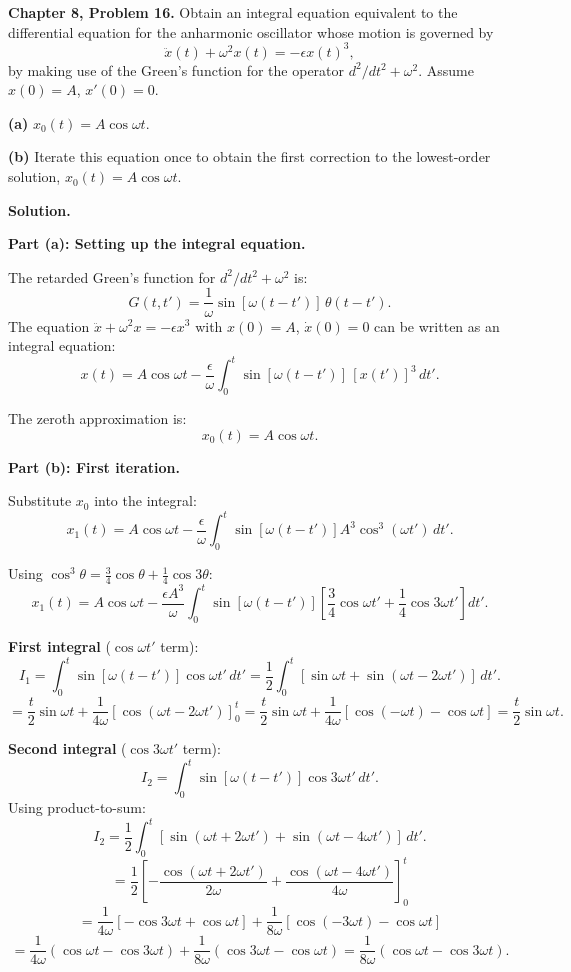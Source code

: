 \documentclass[12pt]{article}
\begin{document}
\textbf{Chapter 8, Problem 16.} Obtain an integral equation equivalent to the differential equation for the anharmonic oscillator whose motion is governed by
\[
\ddot{x}(t) + \omega^2 x(t) = -\epsilon x(t)^3,
\]
by making use of the Green's function for the operator $d^2/dt^2 + \omega^2$. Assume $x(0)=A$, $x'(0)=0$.

\textbf{(a)} $x_0(t) = A\cos\omega t$.

\textbf{(b)} Iterate this equation once to obtain the first correction to the lowest-order solution, $x_0(t) = A\cos\omega t$.

\bigskip
\textbf{Solution.}

\textbf{Part (a): Setting up the integral equation.}

The retarded Green's function for $d^2/dt^2 + \omega^2$ is:
\[
G(t,t') = \frac{1}{\omega}\sin[\omega(t-t')]\,\theta(t-t').
\]
The equation $\ddot{x}+\omega^2 x = -\epsilon x^3$ with $x(0)=A$, $\dot{x}(0)=0$ can be written as an integral equation:
\[
x(t) = A\cos\omega t - \frac{\epsilon}{\omega}\int_0^t \sin[\omega(t-t')]\,[x(t')]^3\,dt'.
\]

The zeroth approximation is:
\[
\boxed{x_0(t) = A\cos\omega t.}
\]

\textbf{Part (b): First iteration.}

Substitute $x_0$ into the integral:
\[
x_1(t) = A\cos\omega t - \frac{\epsilon}{\omega}\int_0^t\sin[\omega(t-t')]A^3\cos^3(\omega t')\,dt'.
\]

Using $\cos^3\theta = \frac{3}{4}\cos\theta + \frac{1}{4}\cos 3\theta$:
\[
x_1(t) = A\cos\omega t - \frac{\epsilon A^3}{\omega}\int_0^t\sin[\omega(t-t')]\left[\frac{3}{4}\cos\omega t'+\frac{1}{4}\cos 3\omega t'\right]dt'.
\]

\textbf{First integral} ($\cos\omega t'$ term):
\[
I_1 = \int_0^t\sin[\omega(t-t')]\cos\omega t'\,dt' = \frac{1}{2}\int_0^t[\sin\omega t + \sin(\omega t-2\omega t')]\,dt'.
\]
\[
= \frac{t}{2}\sin\omega t + \frac{1}{4\omega}[\cos(\omega t-2\omega t')]_0^t = \frac{t}{2}\sin\omega t + \frac{1}{4\omega}[\cos(-\omega t)-\cos\omega t] = \frac{t}{2}\sin\omega t.
\]

\textbf{Second integral} ($\cos 3\omega t'$ term):
\[
I_2 = \int_0^t\sin[\omega(t-t')]\cos 3\omega t'\,dt'.
\]
Using product-to-sum:
\[
I_2 = \frac{1}{2}\int_0^t[\sin(\omega t+2\omega t')+\sin(\omega t-4\omega t')]\,dt'.
\]
\[
= \frac{1}{2}\left[-\frac{\cos(\omega t+2\omega t')}{2\omega}+\frac{\cos(\omega t-4\omega t')}{4\omega}\right]_0^t
\]
\[
= \frac{1}{4\omega}[-\cos 3\omega t+\cos\omega t] + \frac{1}{8\omega}[\cos(-3\omega t)-\cos\omega t]
\]
\[
= \frac{1}{4\omega}(\cos\omega t-\cos 3\omega t) + \frac{1}{8\omega}(\cos 3\omega t-\cos\omega t) = \frac{1}{8\omega}(\cos\omega t-\cos 3\omega t).
\]
\end{document}
